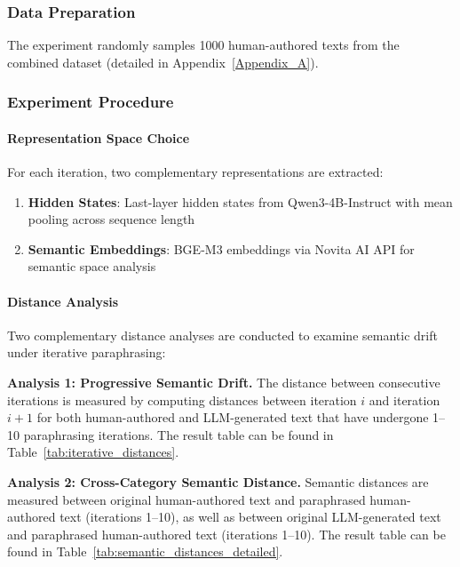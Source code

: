 \subsubsection{Data Preparation}
The experiment randomly samples 1000 human-authored texts from the combined dataset (detailed in Appendix~\ref{Appendix_A}).

\subsubsection{Experiment Procedure}

\paragraph{Representation Space Choice}
For each iteration, two complementary representations are extracted:
\begin{enumerate}
    \item \textbf{Hidden States}: Last-layer hidden states from Qwen3-4B-Instruct with mean pooling across sequence length
    \item \textbf{Semantic Embeddings}: BGE-M3 embeddings via Novita AI API for semantic space analysis
\end{enumerate}

\paragraph{Distance Analysis}
Two complementary distance analyses are conducted to examine semantic drift under iterative paraphrasing:

\textbf{Analysis 1: Progressive Semantic Drift.} The distance between consecutive iterations is measured by computing distances between iteration $i$ and iteration $i+1$ for both human-authored and LLM-generated text that have undergone 1--10 paraphrasing iterations. The result table can be found in Table~\ref{tab:iterative_distances}.

\textbf{Analysis 2: Cross-Category Semantic Distance.} Semantic distances are measured between original human-authored text and paraphrased human-authored text (iterations 1--10), as well as between original LLM-generated text and paraphrased human-authored text (iterations 1--10). The result table can be found in Table~\ref{tab:semantic_distances_detailed}.

